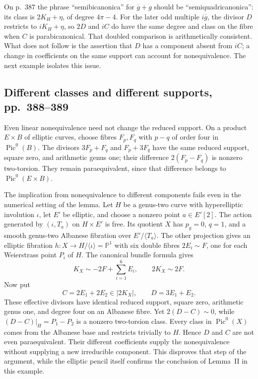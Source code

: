 On p.~387 the phrase ``semibicanonica'' for $\overline g+g$ should be ``semiquadricanonica'': its class is $2K_H+\eta$, of degree $4\pi-4$. For the later odd multiple $i\overline g$, the divisor $D$ restricts to $iK_H+\eta$, so $2D$ and $iC$ do have the same degree and class on the fibre when $C$ is parabicanonical. That doubled comparison is arithmetically consistent. What does not follow is the assertion that $D$ has a component absent from $iC$; a change in coefficients on the same support can account for nonequivalence. The next example isolates this issue.

\subsection{Different classes and different supports, pp.~388--389}

Even linear nonequivalence need not change the reduced support. On a product $E\times B$ of elliptic curves, choose fibres $F_p,F_q$ with $p-q$ of order four in $\operatorname{Pic}^0(B)$. The divisors $3F_p+F_q$ and $F_p+3F_q$ have the same reduced support, square zero, and arithmetic genus one; their difference $2(F_p-F_q)$ is nonzero two-torsion. They remain paraequivalent, since that difference belongs to $\operatorname{Pic}^0(E\times B)$.

The implication from nonequivalence to different components fails even in the numerical setting of the lemma. Let $H$ be a genus-two curve with hyperelliptic involution $\iota$, let $E'$ be elliptic, and choose a nonzero point $a\in E'[2]$. The action generated by $(\iota,T_a)$ on $H\times E'$ is free. Its quotient $X$ has $p_g=0$, $q=1$, and a smooth genus-two Albanese fibration over $E'/\langle T_a\rangle$. The other projection gives an elliptic fibration $h:X\to H/\langle\iota\rangle=\mathbb P^1$ with six double fibres $2E_i\sim F$, one for each Weierstrass point $P_i$ of $H$. The canonical bundle formula gives
\[
 K_X\sim-2F+\sum_{i=1}^6E_i,\qquad 2K_X\sim2F.
\]
Now put
\[
 C=2E_1+2E_2\in|2K_X|,\qquad D=3E_1+E_2.
\]
These effective divisors have identical reduced support, square zero, arithmetic genus one, and degree four on an Albanese fibre. Yet $2(D-C)\sim0$, while $(D-C)|_H=P_1-P_2$ is a nonzero two-torsion class. Every class in $\operatorname{Pic}^0(X)$ comes from the Albanese base and restricts trivially to $H$. Hence $D$ and $C$ are not even paraequivalent. Their different coefficients supply the nonequivalence without supplying a new irreducible component. This disproves that step of the argument, while the elliptic pencil itself confirms the conclusion of Lemma~II in this example.

